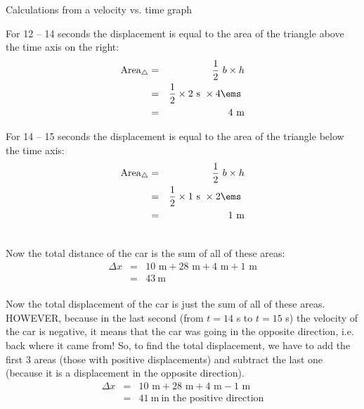 \begin{wex}{Calculations from a velocity vs. time graph}
{\begin{minipage}{0.4\textwidth}
For 12 -- 14 seconds the displacement is equal to the area of the triangle above the time axis on the right:
\begin{eqnarray*}
\text{Area}_{\triangle} &=& \frac{1}{2}~b \times h\\
&=& \frac{1}{2} \times 2\text{~s}\ \times 4 \ems \ \\
&=&4\ \text{m}\\
\end{eqnarray*}
\end{minipage}
\begin{minipage}{0.05\textwidth}
\begin{center}
\end{center}
\end{minipage}
\begin{minipage}{0.4\textwidth}
For 14 -- 15 seconds the displacement is equal to the area of the triangle below the time axis:
\begin{eqnarray*}
\text{Area}_{\triangle} &=& \frac{1}{2}~b \times h\\
&=& \frac{1}{2} \times 1\text{~s}\ \times 2 \ems\ \\
&=&1\ \text{m}\\
\end{eqnarray*}
\end{minipage}
\\
Now the total distance of the car is the sum of all of these areas:
\begin{eqnarray*}
\Delta x&=&10\text{~m} + 28\text{~m} + 4\text{~m} + 1\text{~m}\\
&=&43\ \text{m}
\end{eqnarray*}
\\
Now the total displacement of the car is just the sum of all of these areas. HOWEVER, because in the last second (from $t=14$ s to $t=15$ s) the velocity of the car is negative, it means that the car was going in the opposite direction, i.e. back where it came from! So, to find the total displacement, we have to add the first 3 areas (those with positive displacements) and subtract the last one (because it is a displacement in the opposite direction).
\begin{eqnarray*}
\Delta x&=&10\text{~m} +28\text{~m} +4\text{~m} -1\text{~m}\\
&=&41\ \text{m}\ \mbox{in the positive direction}
\end{eqnarray*}}
\end{wex}
